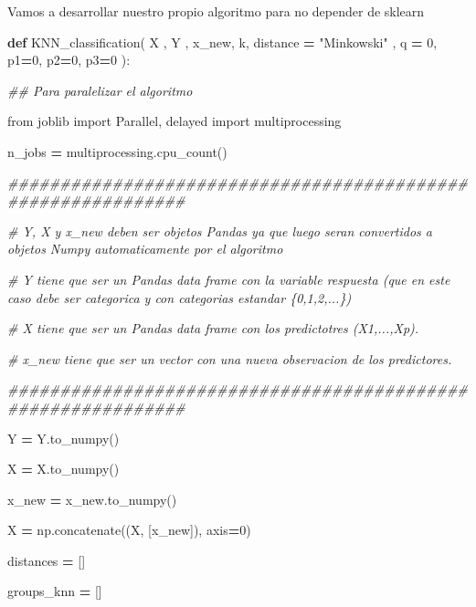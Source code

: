 \documentclass[
  11pt,
  a4paper,
]{article}
\newenvironment{Shaded}{\begin{snugshade}}{\end{snugshade}}
\newcommand{\CommentTok}[1]{\textcolor[rgb]{0.56,0.35,0.01}{\textit{#1}}}
\newcommand{\DecValTok}[1]{\textcolor[rgb]{0.00,0.00,0.81}{#1}}
\newcommand{\ImportTok}[1]{#1}
\newcommand{\KeywordTok}[1]{\textcolor[rgb]{0.13,0.29,0.53}{\textbf{#1}}}
\newcommand{\NormalTok}[1]{#1}
\newcommand{\OperatorTok}[1]{\textcolor[rgb]{0.81,0.36,0.00}{\textbf{#1}}}
\newcommand{\StringTok}[1]{\textcolor[rgb]{0.31,0.60,0.02}{#1}}
\begin{document}
Vamos a desarrollar nuestro propio algoritmo para no depender de sklearn

\begin{Shaded}
\begin{Highlighting}[]
\KeywordTok{def}\NormalTok{ KNN\_classification( X , Y , x\_new, k, distance }\OperatorTok{=} \StringTok{"Minkowski"}\NormalTok{ , q }\OperatorTok{=} \DecValTok{0}\NormalTok{, p1}\OperatorTok{=}\DecValTok{0}\NormalTok{, p2}\OperatorTok{=}\DecValTok{0}\NormalTok{, p3}\OperatorTok{=}\DecValTok{0}\NormalTok{ ):}

    
\CommentTok{\#\# Para paralelizar el algoritmo }

    \ImportTok{from}\NormalTok{ joblib }\ImportTok{import}\NormalTok{ Parallel, delayed}
    \ImportTok{import}\NormalTok{ multiprocessing}

\NormalTok{    n\_jobs  }\OperatorTok{=}\NormalTok{ multiprocessing.cpu\_count()}

\CommentTok{\#\#\#\#\#\#\#\#\#\#\#\#\#\#\#\#\#\#\#\#\#\#\#\#\#\#\#\#\#\#\#\#\#\#\#\#\#\#\#\#\#\#\#\#\#\#\#\#\#\#\#\#\#\#\#\#\#\#\#\#\#}

    \CommentTok{\# Y, X y x\_new deben ser objetos Pandas ya que luego seran convertidos a objetos Numpy automaticamente por el algoritmo}
    
    \CommentTok{\# Y tiene que ser un Pandas data frame con la variable respuesta (que en este caso debe ser categorica y con categorias estandar \{0,1,2,...\}) }

    \CommentTok{\# X tiene que ser un Pandas data frame con los predictotres (X1,...,Xp). }

    \CommentTok{\# x\_new tiene que ser un vector con una nueva observacion de los predictores. }


\CommentTok{\#\#\#\#\#\#\#\#\#\#\#\#\#\#\#\#\#\#\#\#\#\#\#\#\#\#\#\#\#\#\#\#\#\#\#\#\#\#\#\#\#\#\#\#\#\#\#\#\#\#\#\#\#\#\#\#\#\#\#\#\#}

\NormalTok{    Y }\OperatorTok{=}\NormalTok{ Y.to\_numpy()}

\NormalTok{    X }\OperatorTok{=}\NormalTok{ X.to\_numpy() }

\NormalTok{    x\_new }\OperatorTok{=}\NormalTok{ x\_new.to\_numpy()}

\NormalTok{    X }\OperatorTok{=}\NormalTok{ np.concatenate((X, [x\_new]), axis}\OperatorTok{=}\DecValTok{0}\NormalTok{)}


\NormalTok{    distances }\OperatorTok{=}\NormalTok{ []}

\NormalTok{    groups\_knn }\OperatorTok{=}\NormalTok{ []}


\end{Highlighting}
\end{Shaded}
\end{document}
